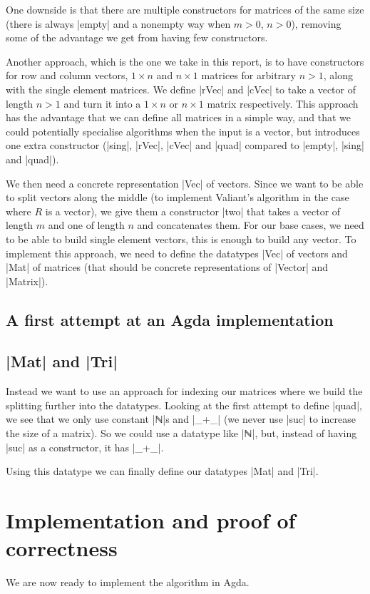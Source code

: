 One downside is that there are multiple constructors for matrices of the same size (there is always |empty| and a nonempty way when $m > 0$, $n > 0$), removing some of the advantage we get from having few constructors.

Another approach, which is the one we take in this report, is to have constructors for row and column vectors, $1 \times n$ and $n \times 1$ matrices for arbitrary $n > 1$, along with the single element matrices. We define |rVec| and |cVec| to take a vector of length $n > 1$ and turn it into a $1 \times n$ or $n \times 1$ matrix respectively.
This approach has the advantage that we can define all matrices in a simple way, and that we could potentially specialise algorithms when the input is a vector, but introduces one extra constructor (|sing|, |rVec|, |cVec| and |quad| compared to |empty|, |sing| and |quad|).

We then need a concrete representation |Vec| of vectors. Since we want to be able to split vectors along the middle (to implement Valiant's algorithm in the case where $R$ is a vector), we give them a constructor |two| that takes a vector of length $m$ and one of length $n$ and concatenates them. For our base cases, we need to be able to build single element vectors, this is enough to build any vector.
To implement this approach, we need to define the datatypes |Vec| of vectors and |Mat| of matrices (that should be concrete representations of |Vector| and |Matrix|).
\subsection{A first attempt at an Agda implementation}
\subsection{|Mat| and |Tri|}
Instead we want to use an approach for indexing our matrices where we build the splitting further into the datatypes. Looking at the first attempt to define |quad|, we see that we only use constant |ℕ|s and |_+_| (we never use |suc| to increase the size of a matrix). So we could use a datatype like |ℕ|, but, instead of having |suc| as a constructor, it has |_+_|.

Using this datatype we can finally define our datatypes |Mat| and |Tri|.
\section{Implementation and proof of correctness}
We are now ready to implement the algorithm in Agda.
\label{Implementation}
